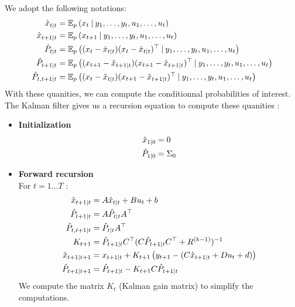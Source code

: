 We adopt the following notations:
\begin{align*}
  \hat{x}_{t \mathbin{\vert} t} &= \mathbb{E}_p \left(x_t \mathbin{\vert} y_1, \ldots , y_t, u_1, \ldots , u_t \right) \\
  \hat{x}_{t+1 \mathbin{\vert} t} &= \mathbb{E}_p \left(x_{t+1} \mathbin{\vert} y_1, \ldots , y_t, u_1, \ldots , u_t \right) \\
  \hat{P}_{t \mathbin{\vert} t} &= \mathbb{E}_p \left((x_t - \hat{x}_{t \mathbin{\vert} t})(x_t - \hat{x}_{t \mathbin{\vert} t})^{\top} \mathbin{\vert} y_1, \ldots , y_t, u_1, \ldots , u_t \right) \\
  \hat{P}_{t+1 \mathbin{\vert} t} &= \mathbb{E}_p \left((x_{t+1} - \hat{x}_{t+1 \mathbin{\vert} t})(x_{t+1} - \hat{x}_{t+1 \mathbin{\vert} t})^{\top} \mathbin{\vert} y_1, \ldots , y_t, u_1, \ldots , u_t \right) \\
  \hat{P}_{t,t+1 \mathbin{\vert} t} &= \mathbb{E}_p \left((x_t - \hat{x}_{t \mathbin{\vert} t})(x_{t+1} - \hat{x}_{t+1 \mathbin{\vert} t})^{\top} \mathbin{\vert} y_1, \ldots , y_t, u_1, \ldots , u_t \right) \\
\end{align*}
With these quanities, we can compute the conditionnal probabilities of interest.
The Kalman filter gives us a recursion equation to compute these quanities :
\begin{itemize}
  \item \textbf{Initialization}\\
    \begin{align*}
      \hat{x}_{1 \mathbin{\vert} 0} &= 0\\
      \hat{P}_{1 \mathbin{\vert} 0} &= \Sigma_0\\
    \end{align*}
  \item \textbf{Forward recursion}\\
    For $t=1 \ldots T$ :
    \begin{align*}
      \hat{x}_{t+1 \mathbin{\vert} t} &= A \hat{x}_{t \mathbin{\vert} t} + B u_t + b\\
      \hat{P}_{t+1 \mathbin{\vert} t} &= A \hat{P}_{t \mathbin{\vert} t} A^{\top}\\
      \hat{P}_{t,t+1 \mathbin{\vert} t} &= \hat{P}_{t \mathbin{\vert} t}A^{\top}\\
      K_{t+1} &= \hat{P}_{t+1 \mathbin{\vert} t}C^{\top}(C \hat{P}_{t+1 \mathbin{\vert} t} C^{\top} + R^{(k-1)})^{-1}\\
      \hat{x}_{t+1 \mathbin{\vert} t+1} &= x_{t+1 \mathbin{\vert} t} + K_{t+1} \left(y_{t+1} - (C\hat{x}_{t+1 \mathbin{\vert} t} + D u_t + d) \right)\\
      \hat{P}_{t+1 \mathbin{\vert} t+1} &= \hat{P}_{t+1 \mathbin{\vert} t} - K_{t+1} C \hat{P}_{t+1 \mathbin{\vert} t}\\
    \end{align*}
    We compute the matrix $K_{t}$ (Kalman gain matrix) to simplify the computations.
\end{itemize}

